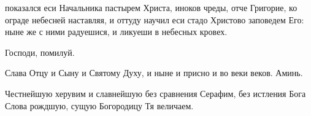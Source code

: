 \begin{mymulticols}
\vspace{-\baselineskip}

\slava

{ показался еси Начальника пастырем Христа, иноков чреды, отче Григорие, ко ограде небесней наставляя, и оттуду научил еси стадо Христово заповедем Его: ныне же с ними радуешися, и ликуеши в небесных кровех.}

\inyne


Господи, помилуй. 

Слава Отцу и Сыну и Святому Духу, и ныне и присно и во веки веков. Аминь.

Честнейшую херувим и славнейшую без сравнения Серафим, без истления Бога Слова рождшую, сущую Богородицу Тя величаем.


\end{mymulticols}

\mychapterending

\begin{mymulticols}
 
\SymbolOfFaith

\end{mymulticols}

\mychapterending

